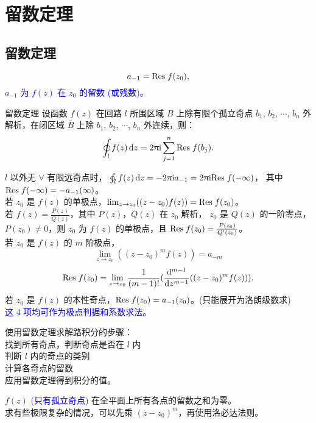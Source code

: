 \documentclass[12pt, a4paper, oneside, UTF8]{ctexbook}
\begin{document}
% 
\else
\fi

\chapter{留数定理}

\section{留数定理}

\[a_{-1} = \mathrm{Res}\;f(z_0),\]
\textcolor{blue}{$a_{-1}$ 为 $f(z)$ 在 $z_0$ 的留数 (或残数)。}

\begin{defn}{留数定理}{}
    设函数 $f(z)$ 在回路 $l$ 所围区域 $B$ 上除有限个孤立奇点 $b_1$, $b_2$, $\cdots$, $b_n$ 
    外解析，在闭区域 $\overline{B}$ 上除  $b_1$, $b_2$, $\cdots$, $b_n$ 外连续，则：
    \[\oint_l f(z) \mathop{}\!\mathrm{d} z = 2 \uppi \mathrm{i} \sum_{j=1}^{n} \mathrm{Res}\;f(b_{j}).\]
\end{defn}
\noindent {} $l$ 以外无 $\forall$ 有限远奇点时，
$\ointclockwise_l f(z) \dif z = - 2 \mpi \mi a_{-1} = 2 \mpi \mi \res f(-\infty)$，
其中 $\mathrm{Res}\;f(-\infty) = - a_{-1}(\infty)$。\\
\noindent {} 若 $z_0$ 是 $f(z)$ 的单极点，$\lim_{z\to z_0} ((z-z_0)f(z)) = \mathrm{Res}\;f(z_0)$。\\
\noindent {} 若 $f(z) = \frac{P(z)}{Q(z)}$，其中 $P(z)$，$Q(z)$ 在 $z_0$ 解析，
$z_0$ 是 $Q(z)$ 的一阶零点，$P(z_0)\neq 0$，则 $z_0$ 为 $f(z)$ 的单极点，且 $\mathrm{Res}\;f(z_0) = \frac{P(z_0)}{Q'(z_0)}$。\\
 若 $z_0$ 是 $f(z)$ 的 $m$ 阶极点，
\[\lim_{z\to z_0} ((z-z_0)^m f(z)) = a_{-m}\]
\[\mathrm{Res}\;f(z_0) = \lim_{z\to z_0} \frac{1}{(m-1)!} (\frac{\mathop{}\!\mathrm{d}^{m-1}}{\mathop{}\!\mathrm{d} z^{m-1}}
((z-z_0)^m f(z))).\] 
 若 $z_0$ 是 $f(z)$ 的本性奇点，$\mathrm{Res}\;f(z_0) = a_{-1}(z_0)$。(只能展开为洛朗级数求)\\
\textcolor{blue}{这 4 项均可作为极点判据和系数求法。}

\noindent {} 使用留数定理求解路积分的步骤：\\
 找到所有奇点，判断奇点是否在 $l$ 内\\
 判断 $l$ 内的奇点的类别\\
 计算各奇点的留数\\
 应用留数定理得到积分的值。

\noindent {} $f(z)$ \textcolor{blue}{(只有孤立奇点)} 在全平面上所有各点的留数之和为零。\\
 求有些极限复杂的情况，可以先乘 $(z-z_0)^m$，再使用洛必达法则。
\end{document}
